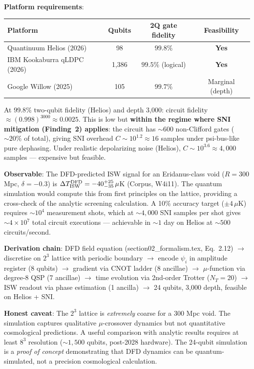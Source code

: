 \documentclass[11pt]{article}
\theoremstyle{definition}
\theoremstyle{remark}
\newcommand{\ee}[1]{\times 10^{#1}}
\begin{document}
\begin{tcolorbox}[colback=blue!5!white, colframe=blue!60!black,
  title=\textbf{W4i14 TOP 5 FINDINGS --- READ FIRST}]
\begin{enumerate}[nosep]
  \textbf{Platform requirements}:
  \begin{center}
  \begin{tabular}{@{}lccc@{}}
  \toprule
  Platform & Qubits & 2Q gate fidelity & Feasibility \\
  \midrule
  Quantinuum Helios (2026) & 98 & $99.8\%$ & \textbf{Yes} \\
  IBM Kookaburra qLDPC (2026) & 1{,}386 & $99.5\%$ (logical) & \textbf{Yes} \\
  Google Willow (2025) & 105 & $99.7\%$ & Marginal (depth) \\
  \bottomrule
  \end{tabular}
  \end{center}

  At $99.8\%$ two-qubit fidelity (Helios) and depth 3{,}000:
  circuit fidelity $\approx (0.998)^{3000} \approx 0.0025$.  This is
  low but \textbf{within the regime where SNI mitigation (Finding~2)
  applies}: the circuit has $\sim 600$ non-Clifford gates ($\sim 20\%$
  of total), giving SNI overhead $C \sim 10^{1.2} \approx 16$ samples
  under psi-bus-like pure dephasing.  Under realistic depolarizing noise
  (Helios), $C \sim 10^{3.6} \approx 4{,}000$ samples --- expensive but
  feasible.

  \textbf{Observable}: The DFD-predicted ISW signal for an Eridanus-class
  void ($R = 300$ Mpc, $\delta = -0.3$) is $\Delta T_{\rm ISW}^{\rm DFD}
  = -40^{+25}_{-35}\,\mu$K (Corpus, W4i11).  The quantum simulation would
  compute this from first principles on the lattice, providing a
  cross-check of the analytic screening calculation.  A 10\% accuracy
  target ($\pm 4\,\mu$K) requires $\sim 10^4$ measurement shots, which
  at $\sim 4{,}000$ SNI samples per shot gives $\sim 4\ee{7}$ total
  circuit executions --- achievable in $\sim 1$ day on Helios at $\sim 500$
  circuits/second.

  \textbf{Derivation chain}: DFD field equation (section02\_formalism.tex,
  Eq.~2.12)
  $\to$ discretise on $2^3$ lattice with periodic boundary
  $\to$ encode $\psi_i$ in amplitude register (8 qubits)
  $\to$ gradient via CNOT ladder (8 ancillae)
  $\to$ $\mu$-function via degree-8 QSP (7 ancillae)
  $\to$ time evolution via 2nd-order Trotter ($N_T = 20$)
  $\to$ ISW readout via phase estimation (1 ancilla)
  $\to$ 24 qubits, 3{,}000 depth, feasible on Helios + SNI.

  \textbf{Honest caveat}: The $2^3$ lattice is \emph{extremely} coarse
  for a 300 Mpc void.  The simulation captures qualitative $\mu$-crossover
  dynamics but not quantitative cosmological predictions.  A useful
  comparison with analytic results requires at least $8^3$ resolution
  ($\sim 1{,}500$ qubits, post-2028 hardware).  The 24-qubit simulation is
  a \emph{proof of concept} demonstrating that DFD dynamics can be
  quantum-simulated, not a precision cosmological calculation.


\end{enumerate}
\end{tcolorbox}
\end{document}
